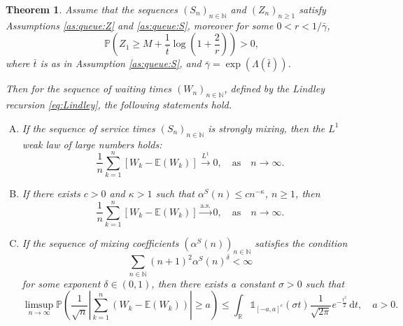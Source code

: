 \documentclass[a4paper,10pt]{article}
\newtheorem{theorem}{Theorem}[section]
\newcommand{\N}{\mathbb{N}}
\renewcommand{\P}{\mathbb{P}}
\newcommand{\E}{\mathbb{E}}
\newcommand{\Pas}{\text{a.s.}}
\newcommand{\ind}{\mathds{1}}
\begin{document}
\begin{theorem}\label{thm:queue:main}
	Assume that the sequences $(S_n)_{n \in \N}$ and $(Z_n)_{n \ge 1}$ satisfy Assumptions \ref{as:queue:Z} and \ref{as:queue:S}, moreover for some $0 < r < 1/\bar{\gamma}$,
	$$
	\P \left(Z_1 \ge M + \frac{1}{\bar{t}}\log \left(1+\frac{2}{r}\right)\right) > 0,
	$$
	where $\bar{t}$ is as in Assumption \ref{as:queue:S}, and $\bar{\gamma} = \exp (\Lambda (\bar{t}))$. 

	Then for the sequence of waiting times $(W_n)_{n\in\N}$, defined by the Lindley recursion \eqref{eq:Lindley}, the following statements hold.
	\begin{enumerate}[A)]
		\item 	If the sequence of service times $(S_n)_{n \in \N}$ is strongly mixing, then the $L^1$ weak law of large numbers holds:
		\[
		\frac{1}{n} \sum_{k=1}^{n} \left[ W_k - \E (W_k) \right] \stackrel{L^1}{\to} 0, \quad \text{as} \quad n \to \infty.
		\]
		
		\item If there exists $c>0$ and $\kappa>1$ such that $\alpha^S(n)\le c n^{-\kappa}$, $n\ge 1$, then
		\[
		\frac{1}{n} \sum_{k=1}^{n} \left[ W_k - \E (W_k) \right] \stackrel{\Pas}{\to} 0, \quad \text{as} \quad n \to \infty.
		\]
		
		\item If the sequence of mixing coefficients $(\alpha^S(n))_{n \in \N}$ satisfies the condition 
		\[
		\sum_{n \in \N} (n+1)^2 \alpha^S(n)^\delta < \infty
		\]
		for some exponent $\delta \in (0,1)$, then there exists a constant $\sigma > 0$ such that
		\[
		\limsup_{n \to \infty} \P \left( \frac{1}{\sqrt{n}} \left| \sum_{k=1}^{n} \left( W_k - \mathbb{E}(W_k) \right) \right| \ge a \right)
		\leq \int_{\mathbb{R}} \ind_{[-a,a]^c}(\sigma t) \frac{1}{\sqrt{2\pi}} e^{-\frac{t^2}{2}} \, \mathrm{d}t, \quad a > 0.
		\]
		
	\end{enumerate}	
\end{theorem}
\end{document}
